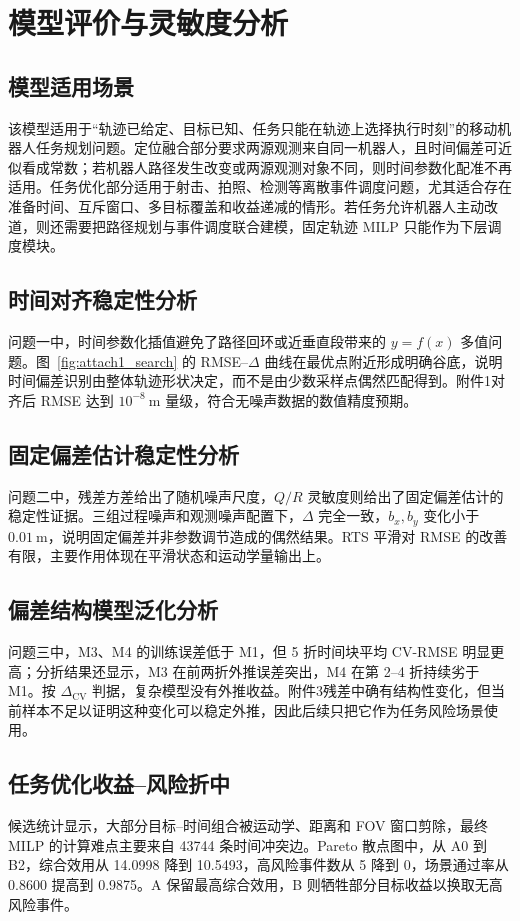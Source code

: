 \documentclass{cumcmthesis}
\begin{document}
\section{模型评价与灵敏度分析}
\subsection{模型适用场景}
该模型适用于“轨迹已给定、目标已知、任务只能在轨迹上选择执行时刻”的移动机器人任务规划问题。定位融合部分要求两源观测来自同一机器人，且时间偏差可近似看成常数；若机器人路径发生改变或两源观测对象不同，则时间参数化配准不再适用。任务优化部分适用于射击、拍照、检测等离散事件调度问题，尤其适合存在准备时间、互斥窗口、多目标覆盖和收益递减的情形。若任务允许机器人主动改道，则还需要把路径规划与事件调度联合建模，固定轨迹 MILP 只能作为下层调度模块。

\subsection{时间对齐稳定性分析}
问题一中，时间参数化插值避免了路径回环或近垂直段带来的 $y=f(x)$ 多值问题。图~\ref{fig:attach1_search} 的 RMSE--$\Delta$ 曲线在最优点附近形成明确谷底，说明时间偏差识别由整体轨迹形状决定，而不是由少数采样点偶然匹配得到。附件1对齐后 RMSE 达到 $10^{-8}\ \mathrm{m}$ 量级，符合无噪声数据的数值精度预期。

\subsection{固定偏差估计稳定性分析}
问题二中，残差方差给出了随机噪声尺度，$Q/R$ 灵敏度则给出了固定偏差估计的稳定性证据。三组过程噪声和观测噪声配置下，$\Delta$ 完全一致，$b_x,b_y$ 变化小于 $0.01\ \mathrm{m}$，说明固定偏差并非参数调节造成的偶然结果。RTS 平滑对 RMSE 的改善有限，主要作用体现在平滑状态和运动学量输出上。

\subsection{偏差结构模型泛化分析}
问题三中，M3、M4 的训练误差低于 M1，但 5 折时间块平均 CV-RMSE 明显更高；分折结果还显示，M3 在前两折外推误差突出，M4 在第 2--4 折持续劣于 M1。按 $\Delta_{\mathrm{CV}}$ 判据，复杂模型没有外推收益。附件3残差中确有结构性变化，但当前样本不足以证明这种变化可以稳定外推，因此后续只把它作为任务风险场景使用。

\subsection{任务优化收益--风险折中}
候选统计显示，大部分目标--时间组合被运动学、距离和 FOV 窗口剪除，最终 MILP 的计算难点主要来自 43744 条时间冲突边。Pareto 散点图中，从 A0 到 B2，综合效用从 14.0998 降到 10.5493，高风险事件数从 5 降到 0，场景通过率从 0.8600 提高到 0.9875。A 保留最高综合效用，B 则牺牲部分目标收益以换取无高风险事件。
\end{document}
